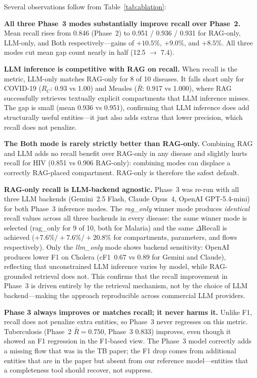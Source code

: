 Several observations follow from Table~\ref{tab:ablation}:

\noindent\textbf{All three Phase~3 modes substantially improve recall over Phase~2.}
Mean recall rises from 0.846 (Phase~2) to 0.951 / 0.936 / 0.931 for RAG-only,
LLM-only, and Both respectively---gains of $+10.5\%$, $+9.0\%$, and $+8.5\%$.
All three modes cut mean gap count nearly in half (12.5 $\to$ 7.4).

\noindent\textbf{LLM inference is competitive with RAG on recall.}
When recall is the metric, LLM-only matches RAG-only for 8 of 10 diseases.
It falls short only for COVID-19 ($R_C$: 0.93 vs 1.00) and Measles ($\bar{R}$: 0.917
vs 1.000), where RAG successfully retrieves textually explicit compartments that LLM
inference misses. The gap is small (mean 0.936 vs 0.951), confirming that LLM
inference does add structurally useful entities---it just also adds extras that
lower precision, which recall does not penalize.

\noindent\textbf{The Both mode is rarely strictly better than RAG-only.}
Combining RAG and LLM adds no recall benefit over RAG-only in any disease and slightly
hurts recall for HIV (0.851 vs 0.906 RAG-only): combining modes can displace a
correctly RAG-placed compartment. RAG-only is therefore the safest default.

\noindent\textbf{RAG-only recall is LLM-backend agnostic.}
Phase~3 was re-run with all three LLM backends (Gemini~2.5 Flash, Claude Opus~4,
OpenAI GPT-5.4-mini) for both Phase~3 inference modes.
The \emph{rag\_only} winner mode produces \emph{identical} recall values across all
three backends in every disease: the same winner mode is selected (rag\_only for 9 of 10,
both for Malaria) and the same $\Delta$Recall is achieved ($+7.6\% / +7.6\% / +20.8\%$
for compartments, parameters, and flows respectively).
Only the \emph{llm\_only} mode shows backend sensitivity: OpenAI produces lower F1 on
Cholera (cF1~0.67 vs 0.89 for Gemini and Claude), reflecting that unconstrained LLM
inference varies by model, while RAG-grounded retrieval does not.
This confirms that the recall improvement in Phase~3 is driven entirely by the
retrieval mechanism, not by the choice of LLM backend---making the approach reproducible
across commercial LLM providers.

\noindent\textbf{Phase 3 always improves or matches recall; it never harms it.}
Unlike F1, recall does not penalize extra entities, so Phase~3 never regresses on this
metric. Tuberculosis (Phase~2 $\bar{R}=0.750$, Phase~3 $0.833$) improves, even though
it showed an F1 regression in the F1-based view. The Phase~3 model correctly adds a
missing flow that was in the TB paper; the F1 drop comes from additional entities that
are in the paper but absent from our reference model---entities that a completeness
tool should recover, not suppress.

